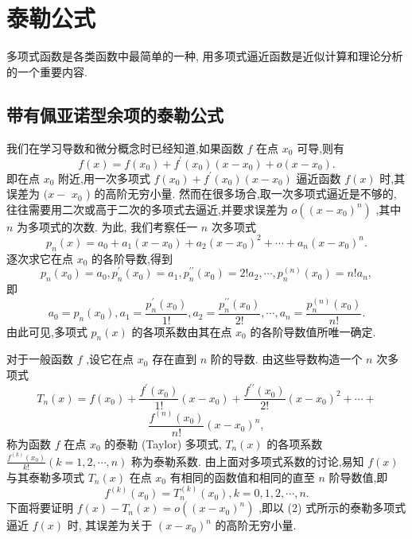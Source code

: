 \section{泰勒公式}

多项式函数是各类函数中最简单的一种, 用多项式逼近函数是近似计算和理论分析的一个重要内容.

\subsection{带有佩亚诺型余项的泰勒公式}

我们在学习导数和微分概念时已经知道,如果函数 \(f\) 在点 \({x}_{0}\) 可导,则有
\[
f\left( x\right)  = f\left( {x}_{0}\right)  + {f}^{\prime }\left( {x}_{0}\right) \left( {x - {x}_{0}}\right)  + o\left( {x - {x}_{0}}\right) .
\]
即在点 \({x}_{0}\) 附近,用一次多项式 \(f\left( {x}_{0}\right)  + {f}^{\prime }\left( {x}_{0}\right) \left( {x - {x}_{0}}\right)\) 逼近函数 \(f\left( x\right)\) 时,其误差为 \((x -\)  \({x}_{0}\) ) 的高阶无穷小量. 然而在很多场合,取一次多项式逼近是不够的,往往需要用二次或高于二次的多项式去逼近,并要求误差为 \(o\left( {\left( x - {x}_{0}\right) }^{n}\right)\) ,其中 \(n\) 为多项式的次数. 为此, 我们考察任一 \(n\) 次多项式
\[
{p}_{n}\left( x\right)  = {a}_{0} + {a}_{1}\left( {x - {x}_{0}}\right)  + {a}_{2}{\left( x - {x}_{0}\right) }^{2} + \cdots  + {a}_{n}{\left( x - {x}_{0}\right) }^{n}. \tag{1}
\]
逐次求它在点 \({x}_{0}\) 的各阶导数,得到
\[
{p}_{n}\left( {x}_{0}\right)  = {a}_{0},{p}_{n}^{\prime }\left( {x}_{0}\right)  = {a}_{1},{p}_{n}^{\prime \prime }\left( {x}_{0}\right)  = 2!{a}_{2},\cdots ,{p}_{n}^{\left( n\right) }\left( {x}_{0}\right)  = n!{a}_{n},
\]
即
\[
{a}_{0} = {p}_{n}\left( {x}_{0}\right) ,{a}_{1} = \frac{{p}_{n}^{\prime }\left( {x}_{0}\right) }{1!},{a}_{2} = \frac{{p}_{n}^{\prime \prime }\left( {x}_{0}\right) }{2!},\cdots ,{a}_{n} = \frac{{p}_{n}^{\left( n\right) }\left( {x}_{0}\right) }{n!}.
\]
由此可见,多项式 \({p}_{n}\left( x\right)\) 的各项系数由其在点 \({x}_{0}\) 的各阶导数值所唯一确定.

对于一般函数 \(f\) ,设它在点 \({x}_{0}\) 存在直到 \(n\) 阶的导数. 由这些导数构造一个 \(n\) 次多项式
\[
{T}_{n}\left( x\right)  = f\left( {x}_{0}\right)  + \frac{{f}^{\prime }\left( {x}_{0}\right) }{1!}\left( {x - {x}_{0}}\right)  + \frac{{f}^{\prime \prime }\left( {x}_{0}\right) }{2!}{\left( x - {x}_{0}\right) }^{2} + \cdots  +
\]
\[
\frac{{f}^{\left( n\right) }\left( {x}_{0}\right) }{n!}{\left( x - {x}_{0}\right) }^{n}, \tag{2}
\]
称为函数 \(f\) 在点 \({x}_{0}\) 的泰勒 (Taylor) 多项式, \({T}_{n}\left( x\right)\) 的各项系数 \(\frac{{f}^{\left( k\right) }\left( {x}_{0}\right) }{k!}\left( {k = 1,2,\cdots ,n}\right)\) 称为泰勒系数. 由上面对多项式系数的讨论,易知 \(f\left( x\right)\) 与其泰勒多项式 \({T}_{n}\left( x\right)\) 在点 \({x}_{0}\) 有相同的函数值和相同的直至 \(n\) 阶导数值,即
\[
{f}^{\left( k\right) }\left( {x}_{0}\right)  = {T}_{n}^{\left( k\right) }\left( {x}_{0}\right) ,k = 0,1,2,\cdots ,n. \tag{3}
\]
下面将要证明 \(f\left( x\right)  - {T}_{n}\left( x\right)  = o\left( {\left( x - {x}_{0}\right) }^{n}\right)\) ,即以 (2) 式所示的泰勒多项式逼近 \(f\left( x\right)\) 时, 其误差为关于 \({\left( x - {x}_{0}\right) }^{n}\) 的高阶无穷小量.

